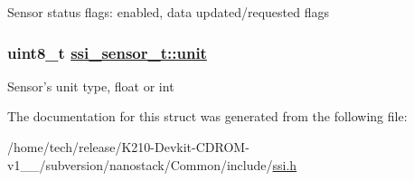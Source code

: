 Sensor status flags: enabled, data updated/requested flags \hypertarget{structssi__sensor__t_a1f1ccefe0efae173472155afc32a384}{
\subsubsection[unit]{\setlength{\rightskip}{0pt plus 5cm}uint8\_\-t \hyperlink{structssi__sensor__t_a1f1ccefe0efae173472155afc32a384}{ssi\_\-sensor\_\-t::unit}}}
\label{structssi__sensor__t_a1f1ccefe0efae173472155afc32a384}


Sensor's unit type, float or int 

The documentation for this struct was generated from the following file:\begin{CompactItemize}
\item 
/home/tech/release/K210-Devkit-CDROM-v1\_\_/subversion/nanostack/Common/include/\hyperlink{ssi_8h}{ssi.h}\end{CompactItemize}
